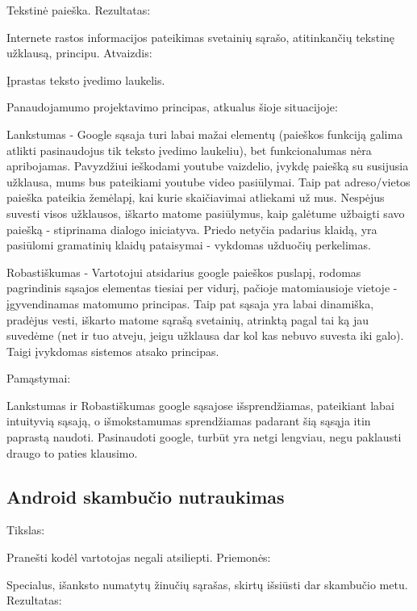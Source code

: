 ﻿\documentclass[a4paper, 12pt]{article}
\begin{document}
		Tekstinė paieška.\newline
		Rezultatas:

		Internete rastos informacijos pateikimas svetainių sąrašo, atitinkančių tekstinę užklausą, principu.\newline
		Atvaizdis:

		Įprastas teksto įvedimo laukelis.\newline

		Panaudojamumo projektavimo principas, atkualus šioje situacijoje:

		Lankstumas - Google sąsaja turi labai mažai elementų (paieškos funkciją galima atlikti pasinaudojus tik teksto įvedimo laukeliu), bet funkcionalumas nėra apribojamas.
		Pavyzdžiui ieškodami youtube vaizdelio, įvykdę paiešką su susijusia užklausa, mums bus pateikiami youtube video pasiūlymai.
		Taip pat adreso/vietos paieška pateikia žemėlapį, kai kurie skaičiavimai atliekami už mus.
		Nespėjus suvesti visos užklausos, iškarto matome pasiūlymus, kaip galėtume užbaigti savo paiešką - stiprinama dialogo iniciatyva.
		Priedo netyčia padarius klaidą, yra pasiūlomi gramatinių klaidų pataisymai - vykdomas užduočių perkelimas.

		Robastiškumas - Vartotojui atsidarius google paieškos puslapį, rodomas pagrindinis sąsajos elementas tiesiai per vidurį, pačioje matomiausioje vietoje - įgyvendinamas matomumo principas.
		Taip pat sąsaja yra labai dinamiška, pradėjus vesti, iškarto matome sąrašą svetainių, atrinktą pagal tai ką jau suvedėme (net ir tuo atveju, jeigu užklausa dar kol kas nebuvo suvesta iki galo).
		Taigi įvykdomas sistemos atsako principas.

		Pamąstymai:

		Lankstumas ir Robastiškumas google sąsajose išsprendžiamas, pateikiant labai intuityvią sąsają, o išmokstamumas sprendžiamas padarant šią sąsąja itin paprastą naudoti.
		Pasinaudoti google, turbūt yra netgi lengviau, negu paklausti draugo to paties klausimo.
	\subsection{Android skambučio nutraukimas}
		Tikslas:

		Pranešti kodėl vartotojas negali atsiliepti.\newline
		Priemonės:

		Specialus, išanksto numatytų žinučių sąrašas, skirtų išsiūsti dar skambučio metu.\newline
		Rezultatas:
\end{document}

